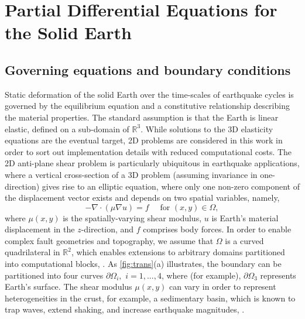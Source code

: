 \section{Partial Differential Equations for the Solid Earth}
\subsection{Governing equations and boundary conditions}
Static deformation of the solid Earth over the time-scales of earthquake cycles is governed by the equilibrium equation and a constitutive relationship describing the material properties.  The standard assumption is that the Earth is linear elastic, defined on a sub-domain of $\mathbb{R}^3$.  While solutions to the 3D elasticity equations are the eventual target, 2D problems are considered in this work in order to sort out implementation details with reduced computational costs.  The 2D anti-plane shear problem \cite{antiplaneshear} is particularly ubiquitous in earthquake applications, where a vertical cross-section of a 3D problem (assuming invariance in one-direction) gives rise to an elliptic equation, where only one non-zero component of the displacement vector exists and depends on two spatial variables, namely,
\begin{equation}
    -\nabla \cdot \left({\mu} \nabla u\right) = f \quad \text{ for } (x, y) \in \Omega, 
    \label{eqn: 2D}
\end{equation}
where ${\mu}(x, y)$ is the spatially-varying shear modulus, $u$ is Earth's material displacement in the $z$-direction, and $f$ comprises body forces. In order to enable complex fault geometries and topography, we assume that $\Omega$ is a curved quadrilateral in $\mathbb{R}^2$, which enables extensions to arbitrary domains partitioned into computational blocks, \cite[e.g.][]{Kozdon2020HybridizedSF}. As \autoref{fig:trans}(a) illustrates, the boundary can be partitioned into four curves $\partial\Omega_i, \,\, i = 1, ..., 4$, where (for example), $\partial \Omega_3$ represents Earth's surface. The shear modulus $\mu(x, y)$ can vary in order to represent heterogeneities in the crust, for example, a sedimentary basin, which is known to trap waves, extend shaking, and increase earthquake magnitudes, \cite[e.g.][]{Boue2016}. 

